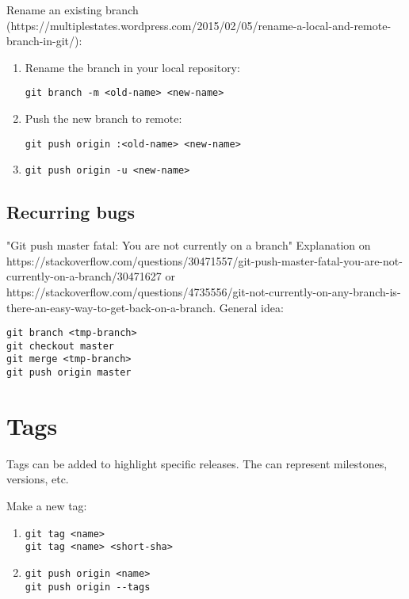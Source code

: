 \documentclass{article}
\begin{document}
Rename an existing branch (https://multiplestates.wordpress.com/2015/02/05/rename-a-local-and-remote-branch-in-git/):
\begin{enumerate}
    \item Rename the branch in your local repository:
    \begin{verbatim}
git branch -m <old-name> <new-name>
    \end{verbatim}
    \item Push the new branch to remote:
    \begin{verbatim}
git push origin :<old-name> <new-name>
    \end{verbatim}
    \item 
    \begin{verbatim}
git push origin -u <new-name>
    \end{verbatim}
\end{enumerate}

\subsection{Recurring bugs}

"Git push master fatal: You are not currently on a branch"
Explanation on https://stackoverflow.com/questions/30471557/git-push-master-fatal-you-are-not-currently-on-a-branch/30471627 or https://stackoverflow.com/questions/4735556/git-not-currently-on-any-branch-is-there-an-easy-way-to-get-back-on-a-branch.
General idea:
\begin{verbatim}
git branch <tmp-branch>
git checkout master
git merge <tmp-branch>
git push origin master
\end{verbatim}

\section{Tags}
Tags can be added to highlight specific releases. The can represent milestones, versions, etc.

Make a new tag:
\begin{enumerate}
    \item
    \begin{verbatim}
git tag <name>
git tag <name> <short-sha>
    \end{verbatim}
    \item
    \begin{verbatim}
git push origin <name>
git push origin --tags
    \end{verbatim}
\end{enumerate}
\end{document}
